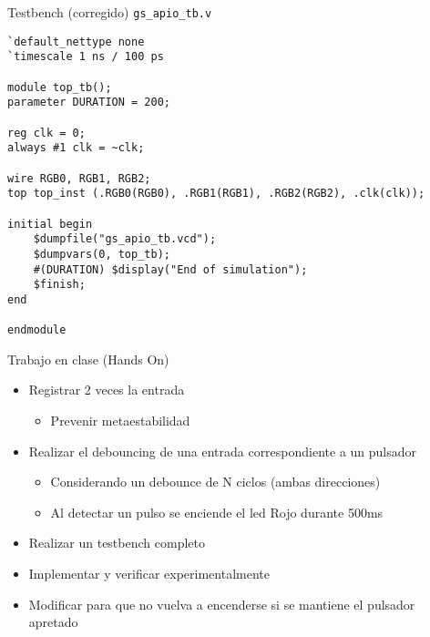 \documentclass{beamer}
\begin{document}
\begin{frame}[fragile]{Testbench (corregido) \texttt{gs\_apio\_tb.v}}
\begin{center}\begin{adjustbox}{padding=2pt 0pt 0pt 0pt, cfbox=blue!50 1pt}\begin{lstlisting}
`default_nettype none
`timescale 1 ns / 100 ps

module top_tb();
parameter DURATION = 200;

reg clk = 0;
always #1 clk = ~clk;

wire RGB0, RGB1, RGB2;
top top_inst (.RGB0(RGB0), .RGB1(RGB1), .RGB2(RGB2), .clk(clk));

initial begin
	$dumpfile("gs_apio_tb.vcd");
	$dumpvars(0, top_tb);
	#(DURATION) $display("End of simulation");
	$finish;
end

endmodule
\end{lstlisting}\end{adjustbox}\end{center}
\end{frame}

\begin{frame}[fragile]{Trabajo en clase (Hands On)}
\begin{itemize}
	\item Registrar 2 veces la entrada
	\begin{itemize}	
		\item Prevenir metaestabilidad
	\end{itemize}
	\item Realizar el debouncing de una entrada correspondiente a un pulsador
	\begin{itemize}
		\item Considerando un debounce de N ciclos (ambas direcciones)
		\item Al detectar un pulso se enciende el led Rojo durante 500ms
	\end{itemize}
	\item Realizar un testbench completo
	\item Implementar y verificar experimentalmente
	\item Modificar para que no vuelva a encenderse si se mantiene el pulsador apretado
\end{itemize}
\end{frame}
\end{document}
